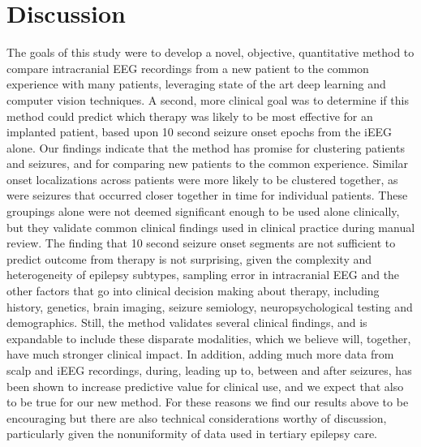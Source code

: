 \documentclass[11pt]{article}
\begin{document}
\section*{Discussion}
The goals of this study were to develop a novel, objective, quantitative method to compare intracranial EEG recordings from a new patient to the common experience with many patients, leveraging state of the art deep learning and computer vision techniques. A second, more clinical goal was to determine if this method could predict which therapy was likely to be most effective for an implanted patient, based upon 10 second seizure onset epochs from the iEEG alone. Our findings indicate that the method has promise for clustering patients and seizures, and for comparing new patients to the common experience. Similar onset localizations across patients were more likely to be clustered together, as were seizures that occurred closer together in time for individual patients. These groupings alone were not deemed significant enough to be used alone clinically, but they validate common clinical findings used in clinical practice during manual review. The finding that 10 second seizure onset segments are not sufficient to predict outcome from therapy is not surprising, given the complexity and heterogeneity of epilepsy subtypes, sampling error in intracranial EEG and the other factors that go into clinical decision making about therapy, including history, genetics, brain imaging, seizure semiology, neuropsychological testing and demographics. Still, the method validates several clinical findings, and is expandable to include these disparate modalities, which we believe will, together, have much stronger clinical impact. In addition, adding much more data from scalp and iEEG recordings, during, leading up to, between and after seizures, has been shown to increase predictive value for clinical use, and we expect that also to be true for our new method\cite{kline_multimodal_2022}. For these reasons we find our results above to be encouraging but there are also technical considerations worthy of discussion, particularly given the nonuniformity of data used in tertiary epilepsy care. 
\end{document}
